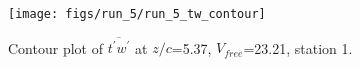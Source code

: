 \begin{figure}[H]
\centering
\texttt{[image: figs/run\_5/run\_5\_tw\_contour]}
\caption{Contour plot of $\overline{t^\prime w^\prime}$ at $z/c$=5.37, $V_{free}$=23.21, station 1.}
\label{fig:run_5_tw_contour}
\end{figure}


